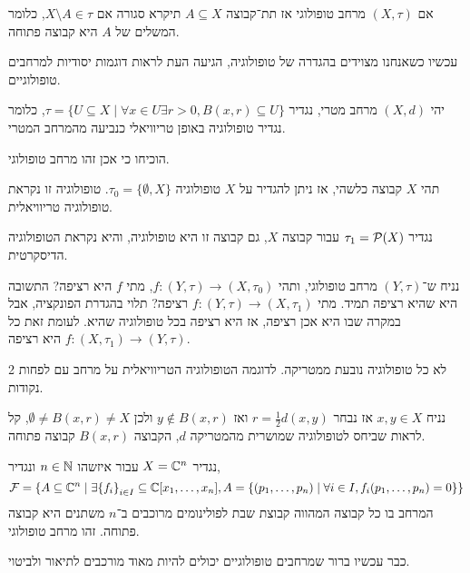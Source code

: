 \begin{definition}
	אם $(X, \tau)$ מרחב טופולוגי אז תת־קבוצה $A \subseteq X$ תיקרא סגורה אם $X \setminus A \in \tau$, כלומר המשלים של $A$ היא קבוצה פתוחה.
\end{definition}
עכשיו כשאנחנו מצוידים בהגדרה של טופולוגיה, הגיעה העת לראות דוגמות יסודיות למרחבים טופולוגיים.
\begin{example}
	יהי $(X, d)$ מרחב מטרי, נגדיר $\tau = \{ U \subseteq X \mid \forall x \in U \exists r > 0, B(x, r) \subseteq U \}$, כלומר נגדיר טופולוגיה באופן טריוויאלי כנביעה מהמרחב המטרי.
\end{example}
\begin{exercise}
	הוכיחו כי אכן זהו מרחב טופולוגי.
\end{exercise}
\begin{example}
	תהי $X$ קבוצה כלשהי, אז ניתן להגדיר על $X$ טופולוגיה $\tau_0 = \{ \emptyset, X \}$.
	טופולוגיה זו נקראת טופולוגיה טריוויאלית.
\end{example}
\begin{example}
	נגדיר $\tau_1 = \mathcal{P}(X)$ עבור קבוצה $X$, גם קבוצה זו היא טופולוגיה, והיא נקראת הטופולוגיה הדיסקרטית.
\end{example}
\begin{example}
	נניח ש־$(Y, \tau)$ מרחב טופולוגי, ותהי $f : (Y, \tau) \to (X, \tau_0)$, מתי $f$ היא רציפה? התשובה היא שהיא רציפה תמיד.
	מתי $f : (Y, \tau) \to (X, \tau_1)$ רציפה? תלוי בהגדרת הפונקציה, אבל במקרה שבו היא אכן רציפה, אז היא רציפה בכל טופולוגיה שהיא.
	לעומת זאת כל $f : (X, \tau_1) \to (Y, \tau)$ היא רציפה.
\end{example}
\begin{remark}
	לא כל טופולוגיה נובעת ממטריקה.
	לדוגמה הטופולוגיה הטריוויאלית על מרחב עם לפחות 2 נקודות.

	נניח $x, y \in X$ אז נבחר $r = \frac{1}{2} d(x, y)$ ואז $y \notin B(x, r)$ ולכן $\emptyset \ne B(x, r) \ne X$, קל לראות שביחס לטופולוגיה שמושרית מהמטריקה $d$, הקבוצה $B(x, r)$ קבוצה פתוחה.
\end{remark}
\begin{example}
	נגדיר $X = \mathbb{C}^n$ עבור איזשהו $n \in \mathbb{N}$ ונגדיר,
	\[
		\mathcal{F} = \{ A \subseteq \mathbb{C}^n \mid \exists {\{f_i\}}_{i \in I} \subseteq \mathbb{C}[x_1, \dots, x_n], A = \{(p_1, \dots, p_n) \mid \forall i \in I, f_i(p_1, \dots, p_n) = 0 \}\}
	\]
	המרחב בו כל קבוצה המהווה קבוצת שבת לפולינומים מרוכבים ב־$n$ משתנים היא קבוצה פתוחה.
	זהו מרחב טופולוגי.
\end{example}
כבר עכשיו ברור שמרחבים טופולוגיים יכולים להיות מאוד מורכבים לתיאור ולביטוי.
